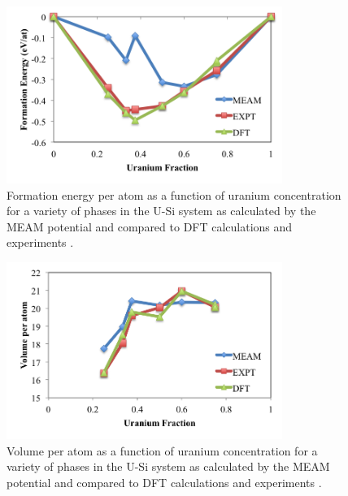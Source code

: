 \documentclass[review]{elsarticle}
\begin{document}
\begin{figure}[hbt]
	\centering
	\includegraphics[width=0.8\textwidth]{EvsC_KK1.png}
    \caption{Formation energy per atom as a function of uranium concentration for a variety of phases in the U-Si system as calculated by the MEAM potential and compared to DFT calculations \cite{noordhoek2016} and experiments \cite{berche2009}.}\label{fig:eform3}
\end{figure}

 \begin{figure}[hbt]
	\centering
	\includegraphics[width=0.8\textwidth]{VvsC_KK1.png}
    \caption{Volume per atom as a function of uranium concentration for a variety of phases in the U-Si system as calculated by the MEAM potential and compared to DFT calculations \cite{noordhoek2016} and experiments \cite{berche2009}.}\label{fig:vol3}
\end{figure}

\FloatBarrier
\end{document}
